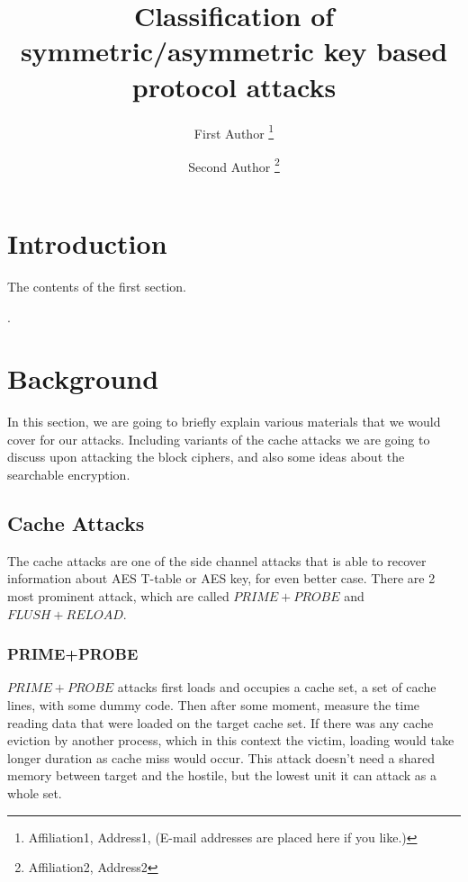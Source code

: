 \documentclass[a4paper]{article}
\begin{document}
\title{
  Classification of symmetric/asymmetric key based protocol attacks     %
}
\author{
  First Author           %
  \thanks{
    Affiliation1, Address1,   %
    (E-mail addresses are placed here if you like.)
  }
  \and
  Second Author          %
  \thanks{ %
    Affiliation2, Address2  %
  }
}

\maketitle

\section{Introduction}

The contents of the first section.

\newpage
.
\newpage
\section{Background}

In this section, we are going to briefly explain various materials that we would cover for our attacks. Including variants of the cache attacks we are going to discuss upon attacking the block ciphers, and also some ideas about the searchable encryption.

\subsection{Cache Attacks}

The cache attacks are one of the side channel attacks that is able to recover information about AES T-table or AES key, for even better case. There are 2 most prominent attack, which are called $PRIME+PROBE$ and $FLUSH+RELOAD$.

\subsubsection{PRIME+PROBE}

$PRIME+PROBE$ attacks first loads and occupies a cache set, a set of cache lines, with some dummy code. Then after some moment, measure the time reading data that were loaded on the target cache set. If there was any cache eviction by another process, which in this context the victim, loading would take longer duration as cache miss would occur. This attack doesn't need a shared memory between target and the hostile, but the lowest unit it can attack as a whole set.
\end{document}
